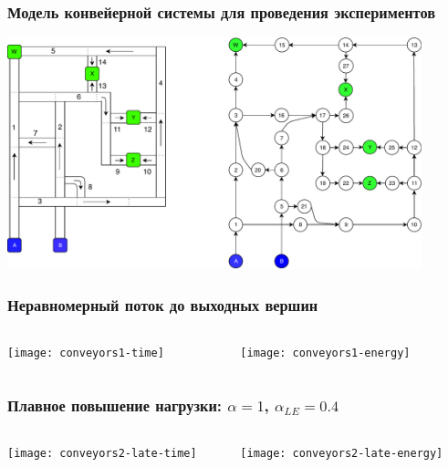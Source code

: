 \documentclass{beamer}
\begin{document}

\begin{frame}
  \frametitle{Модель конвейерной системы для проведения экспериментов}
  \begin{center}
    \includegraphics[width=0.9\textwidth]{test-conveyors} 
  \end{center}
\end{frame}


\begin{frame}
  \frametitle{Неравномерный поток до выходных вершин}
  \begin{columns}
    \begin{column}{0.5\textwidth}
      \texttt{[image: conveyors1-time]}
    \end{column}
    \begin{column}{0.5\textwidth}
      \texttt{[image: conveyors1-energy]}
    \end{column}
  \end{columns}
\end{frame}


\begin{frame}
  \frametitle{Плавное повышение нагрузки: $\alpha = 1$, $\alpha_{LE} = 0.4$}
  \begin{columns}
    \begin{column}{0.5\textwidth}
      \texttt{[image: conveyors2-late-time]}
    \end{column}
    \begin{column}{0.5\textwidth}
      \texttt{[image: conveyors2-late-energy]}
    \end{column}
  \end{columns}
\end{frame}
\end{document}
